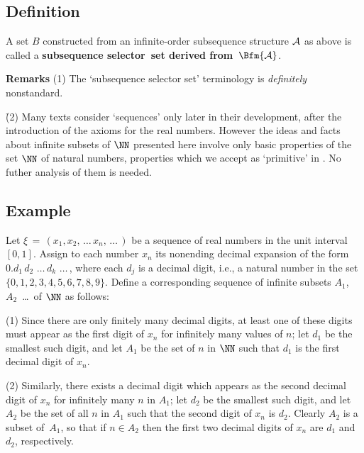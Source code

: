 {\V

        \subsection{\small{{\bf Definition}}}
        \label{DefA40.60}

\V

        A set $B$ constructed from an infinite-order subsequence structure ${\cal A}$ as above is called a
    {\bf subsequence selector~set derived from~$\Bfm{\cal A}$}.

\V

        {\bf Remarks} (1) The `subsequence selector set' terminology is {\em definitely} nonstandard.

\V

       \h (2) Many texts consider `sequences' only later in their development, after the introduction of the axioms for the real numbers.
    However the ideas and facts about infinite subsets of ${\NN}$ presented here involve only basic properties of the set ${\NN}$ of natural numbers,
    properties which we accept as `primitive' in {\ThisText}. No futher analysis of them is needed.

\V

        \subsection{\small{{\bf Example}}} 
        \label{ExampA40.70}

        Let ${\xi} \,=\, (x_{1}, x_{2}, \,{\ldots}\,x_{n}, \,{\ldots}\,)$ be a sequence of real numbers in the unit interval $[0,1]$.
    Assign to each number $x_{n}$ its nonending decimal expansion of the form $0.d_{1}\,d_{2}\,\,{\ldots}\,d_{k}\,\,{\ldots}\,$,
    where each $d_{j}$ is a decimal digit, i.e., a natural number in the set $\{0,1,2,3,4,5,6,7,8,9\}$.
    Define a corresponding sequence of infinite subsets $A_{1}$, $A_{2}$ \,{\ldots}\, of ${\NN}$ as follows:

    (1) Since there are only finitely many decimal digits, at least one of these digits
    must appear as the first digit of $x_{n}$ for infinitely many values of $n$; let $d_{1}$ be the smallest such digit,
    and let $A_{1}$ be the set of $n$ in ${\NN}$ such that $d_{1}$ is the first decimal digit of $x_{n}$.


       (2) Similarly, there exists a decimal digit which appears as the second decimal digit of $x_{n}$ for infinitely many $n$ in $A_{1}$;
    let $d_{2}$ be the smallest such digit, and let $A_{2}$ be the set of all $n$ in $A_{1}$ such that the second digit of $x_{n}$ is $d_{2}$.
    Clearly $A_{2}$ is a subset of~$A_{1}$, so that if $n{\in}A_{2}$ then the first two decimal digits of $x_{n}$ are $d_{1}$ and $d_{2}$, respectively.

}
